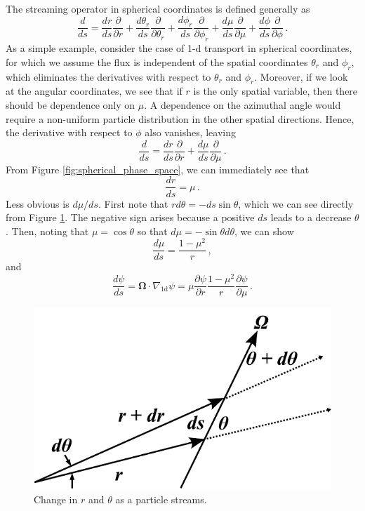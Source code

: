 The streaming operator in spherical coordinates is defined generally as 
\begin{equation}
 \frac{d}{ds} = \frac{dr}{ds}\frac{\partial}{\partial r} + \frac{d\theta_r}{ds}\frac{\partial}{\partial \theta_r} + \frac{d\phi_r}{ds}\frac{\partial}{\partial \phi_r} + \frac{d\mu}{ds}\frac{\partial}{\partial \mu} + \frac{d\phi}{ds}\frac{\partial}{\partial \phi} \, .
\end{equation}
As a simple example, consider the case of 1-d transport in spherical coordinates, for which we assume the flux is independent of the spatial coordinates $\theta_{r}$ and $\phi_{r}$, which eliminates the derivatives with respect to $\theta_r$ and $\phi_r$.  Moreover, if we look at the angular coordinates, we see that if $r$ is the only spatial variable, then there should be dependence only on $\mu$.  A dependence on the azimuthal angle would require a non-uniform particle distribution in the other spatial directions.  Hence, the derivative with respect to $\phi$ also vanishes, leaving
\begin{equation}
 \frac{d}{ds} = \frac{dr}{ds}\frac{\partial}{\partial r} + \frac{d\mu}{ds}\frac{\partial}{\partial \mu}  \, .
\end{equation}
From Figure \ref{fig:spherical_phase_space}, we can immediately see that
\begin{equation}
 \frac{dr}{ds} = \mu \, .
 \label{eq:drds}
\end{equation}
Less obvious is $d\mu/ds$.  First note that $r d\theta = -ds \sin\theta$, which we can see directly from Figure \ref{fig:spherical_angle_with_r}.  The negative sign arises because a positive $ds$ leads to a decrease $\theta$. Then, noting that $\mu = \cos{\theta}$ so that $d\mu = -\sin{\theta} d\theta$, we can show
\begin{equation}
 \frac{d\mu}{ds} = \frac{1-\mu^2}{r} \, ,
 \label{eq:dmuds}
\end{equation}
and
\begin{equation}
 \frac{d\psi}{ds} = \mathbf{\Omega} \cdot \nabla_{\text{1d}} \psi = \mu \frac{\partial \psi}{\partial r} \frac{1-\mu^2}{r}\frac{\partial \psi}{\partial \mu} \, .
\end{equation}


\begin{figure}[ht] 
    \centering
    \includegraphics[keepaspectratio, width = 2.5 in]{images/spherical_angle_with_r}
    \caption{Change in $r$ and $\theta$ as a particle streams.}
    \label{fig:spherical_angle_with_r}
\end{figure}


